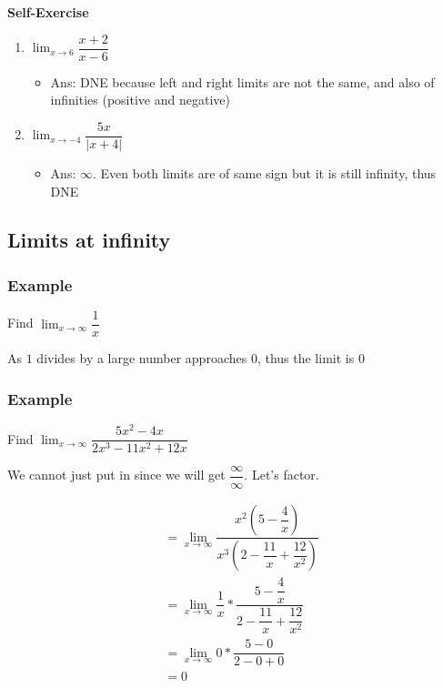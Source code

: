 \documentclass[t]{beamer}
\theoremstyle{plain}
\theoremstyle{definition}
\newcounter{heading}
\newcommand{\makeheading}[1]{\medskip\begin{large}\noindent\textbf{{#1}}\end{large}\smallskip}
\newcommand{\limm}[1]{\displaystyle \lim_{x\to #1}}
\begin{document}
\begin{frame}
\makeheading{Self-Exercise}
\footnotesize

\begin{enumerate}

\item $\limm{6}\dfrac{x + 2}{x - 6}$
\begin{itemize}
	\item Ans: DNE because left and right limits are not the same, and also of infinities (positive and negative)
\end{itemize}

\item $\limm{-4}\dfrac{5x}{|x+4|}$
\begin{itemize}
	\item Ans: $\infty$.   Even both limits are of same sign but it is still infinity, thus DNE
\end{itemize}


\end{enumerate}

\end{frame}

\subsection{Limits at infinity}

\begin{frame}
\frametitle{Example}
	Find $\limm{\infty}\dfrac{1}{x}$
	
	\vspace{2em}
	
    As $1$ divides by a large number approaches 0, thus the limit is 0

\end{frame}

\begin{frame}
\frametitle{Example}
	Find $\limm{\infty}\dfrac{5x^2 - 4x}{2x^3 - 11x^2 + 12x}$
	
	\vspace{1em}

	We cannot just put in since we will get $\dfrac{\infty}{\infty}$.	Let's factor.
	
	\begin{align*}
  	&= \limm{\infty}\dfrac{x^2(5 - \dfrac{4}{x})}{x^3(2 - \dfrac{11}{x} + \dfrac{12}{x^2})}\\
  	&= \limm{\infty}\dfrac{1}{x} * \dfrac{5 - \dfrac{4}{x}}{2 - \dfrac{11}{x} + \dfrac{12}{x^2}} \\
  	&= \limm{\infty}0 * \dfrac{5 - 0}{2 - 0 + 0} \\
  	&= 0
	\end{align*}	
	
\end{frame}
\end{document}
